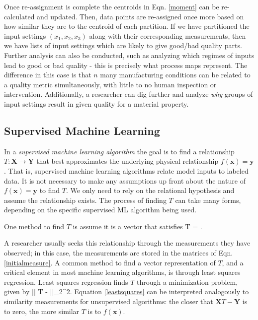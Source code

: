 Once re-assignment is complete the centroids in Eqn. \ref{moment} can be re-calculated and updated.
Then, data points are re-assigned once more based on how similar they are to the centroid of each partition.
If we have partitioned the input settings $(x_1, x_2, x_3)$ along with their corresponding measurements, then we have lists of input settings which are likely to give good/bad quality parts.
Further analysis can also be conducted, such as analyzing which regimes of inputs lead to good or bad quality - this is precisely what process maps represent.
The difference in this case is that $n$ many manufacturing conditions can be related to a quality metric simultaneously, with little to no human inspection or intervention.
Additionally, a researcher can dig further and analyze \textit{why} groups of input settings result in given quality for a material property.



\subsection{Supervised Machine Learning}
In a \textit{supervised machine learning algorithm} the goal is to find a relationship $T: \mathbf{X} \to \mathbf{Y}$ that best approximates the underlying physical relationship $f(\mathbf{x}) = \mathbf{y}$.
That is, supervised machine learning algorithms relate model inputs to labeled data.
It is not necessary to make any assumptions up front about the nature of $f(\mathbf{x}) = \mathbf{y}$ to find $T$.
We only need to rely on the relational hypothesis and assume the relationship exists.
The process of finding $T$ can take many forms, depending on the specific supervised ML algorithm being used.

One method to find $T$ is assume it is a vector that satisfies
\eqn
{}T = .
\label{map}
\equ

A researcher usually seeks this relationship through the measurements they have observed; in this case, the measurements are stored in the matrices of Eqn. \ref{initialmeasure}.
A common method to find a vector representation of $T$, and a critical element in most machine learning algorithms, is through least squares regression. Least squares regression finds $T$ through a minimization problem, given by
\eqn
\min || T -  ||_{2}^{2}.
\label{leastsquares}
\equ
Equation \ref{leastsquares} can be interpreted analogously to similarity measurements for unsupervised algorithms: the closer that $\mathbf{X}T - \mathbf{Y}$ is to zero, the more similar $T$ is to $f(\mathbf{x})$.

